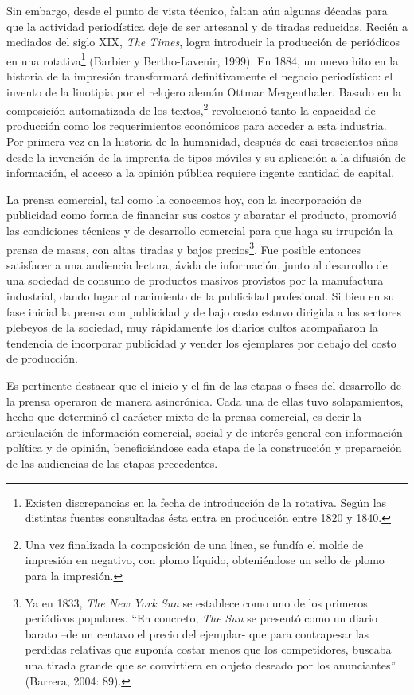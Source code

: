 Sin embargo, desde el punto de vista técnico, faltan aún algunas décadas para que la actividad periodística deje de ser artesanal y de tiradas reducidas. Recién a mediados del siglo XIX, \emph{The Times}, logra introducir la producción de periódicos en una rotativa\footnote{Existen discrepancias en la fecha de introducción de la rotativa. Según las distintas fuentes consultadas ésta entra en producción entre 1820 y 1840.} (Barbier y Bertho-Lavenir, 1999). En 1884, un nuevo hito en la historia de la impresión transformará definitivamente el negocio periodístico: el invento de la linotipia por el relojero alemán Ottmar Mergenthaler. Basado en la composición automatizada de los textos,\footnote{Una vez finalizada la composición de una línea, se fundía el molde de impresión en negativo, con plomo líquido, obteniéndose un sello de plomo para la impresión.} revolucionó tanto la capacidad de producción como los requerimientos económicos para acceder a esta industria. Por primera vez en la historia de la humanidad, después de casi trescientos años desde la invención de la imprenta de tipos móviles y su aplicación a la difusión de información, el acceso a la opinión pública requiere ingente cantidad de capital.

La prensa comercial, tal como la conocemos hoy, con la incorporación de publicidad como forma de financiar sus costos y abaratar el producto, promovió las condiciones técnicas y de desarrollo comercial para que haga su irrupción la prensa de masas, con altas tiradas y bajos precios\footnote{Ya en 1833, \emph{The New York Sun} se establece como uno de los primeros periódicos populares. ``En concreto, \emph{The} \emph{Sun} se presentó como un diario barato --de un centavo el precio del ejemplar- que para contrapesar las perdidas relativas que suponía costar menos que los competidores, buscaba una tirada grande que se convirtiera en objeto deseado por los anunciantes'' (Barrera, 2004: 89).}. Fue posible entonces satisfacer a una audiencia lectora, ávida de información, junto al desarrollo de una sociedad de consumo de productos masivos provistos por la manufactura industrial, dando lugar al nacimiento de la publicidad profesional. Si bien en su fase inicial la prensa con publicidad y de bajo costo estuvo dirigida a los sectores plebeyos de la sociedad, muy rápidamente los diarios cultos acompañaron la tendencia de incorporar publicidad y vender los ejemplares por debajo del costo de producción.

Es pertinente destacar que el inicio y el fin de las etapas o fases del desarrollo de la prensa operaron de manera asincrónica. Cada una de ellas tuvo solapamientos, hecho que determinó el carácter mixto de la prensa comercial, es decir la articulación de información comercial, social y de interés general con información política y de opinión, beneficiándose cada etapa de la construcción y preparación de las audiencias de las etapas precedentes.

